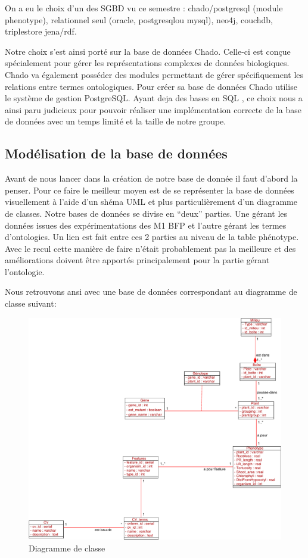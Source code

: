\documentclass[11pt,french,]{article}
\begin{document}
On a eu le choix d'un des SGBD vu ce semestre : chado/postgresql (module
phenotype), relationnel seul (oracle, postgresqlou mysql), neo4j,
couchdb, triplestore jena/rdf.

Notre choix s'est ainsi porté sur la base de données Chado. Celle-ci est
conçue spécialement pour gérer les représentations complexes de données
biologiques. Chado va également posséder des modules permettant de gérer
spécifiquement les relations entre termes ontologiques. Pour créer sa
base de données Chado utilise le système de gestion PostgreSQL. Ayant
deja des bases en SQL , ce choix nous a ainsi paru judicieux pour
pouvoir réaliser une implémentation correcte de la base de données avec
un temps limité et la taille de notre groupe.

\hypertarget{modelisation-de-la-base-de-donnees}{%
\subsection{Modélisation de la base de
données}\label{modelisation-de-la-base-de-donnees}}

Avant de nous lancer dans la création de notre base de donnée il faut
d'abord la penser. Pour ce faire le meilleur moyen est de se représenter
la base de données visuellement à l'aide d'un shéma UML et plus
particulièrement d'un diagramme de classes. Notre bases de données se
divise en ``deux'' parties. Une gérant les données issues des
expérimentations des M1 BFP et l'autre gérant les termes d'ontologies.
Un lien est fait entre ces 2 parties au niveau de la table phénotype.
Avec le recul cette manière de faire n'était probablement pas la
meilleure et des améliorations doivent être apportés principalement pour
la partie gérant l'ontologie.

Nous retrouvons ansi avec une base de données correspondant au diagramme
de classe suivant:

\begin{figure}[h]
 \centering
 \includegraphics{../img/class_diagram.pdf}
 \caption{Diagramme de classe}
\end{figure}
\end{document}
